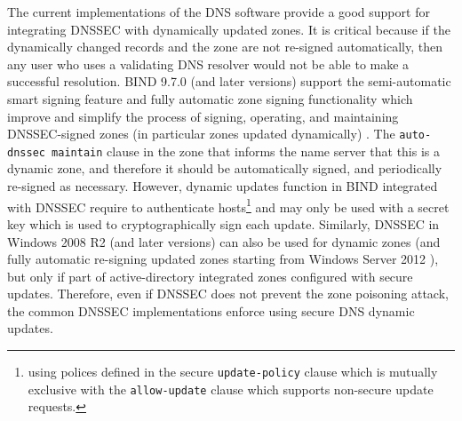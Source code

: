 The current implementations of the DNS software provide a good support for integrating DNSSEC with dynamically updated zones.
It is critical because if the dynamically changed records and the zone are not re-signed automatically, then any user who uses a validating DNS resolver would not be able to make a successful resolution.
BIND 9.7.0 (and later versions) support the semi-automatic smart signing feature and fully automatic zone signing functionality which improve and simplify the process of signing, operating, and maintaining DNSSEC-signed zones (in particular zones updated dynamically) \cite{bindman}.
The \texttt{auto-dnssec maintain} clause in the zone that informs the name server that this is a dynamic zone, and therefore it should be automatically signed, and periodically re-signed as necessary.
However, dynamic updates function in BIND integrated with DNSSEC require to authenticate hosts\footnote{using polices defined in the secure \texttt{update-policy} clause which is mutually exclusive with the \texttt{allow-update} clause which supports non-secure update requests.} and may only be used with a secret key %
which is used to cryptographically sign each update.
Similarly, DNSSEC in %
Windows 2008 R2 \cite{micro} (and later versions) can also be used for dynamic zones (and fully automatic re-signing updated zones starting from Windows Server 2012 \cite{micro2}), but only if part of active-directory integrated zones configured with secure updates.
Therefore, even if DNSSEC does not prevent the zone poisoning attack, the common DNSSEC implementations enforce using secure DNS dynamic updates.